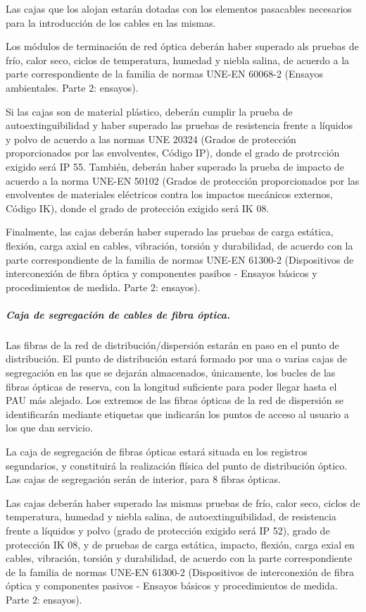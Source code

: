 Las cajas que los alojan estarán dotadas con los elementos pasacables necesarios para la introducción de los cables en las mismas.

Los módulos de terminación de red óptica deberán haber superado als pruebas de frío, calor seco, ciclos de temperatura, humedad y niebla salina, de acuerdo a la parte correspondiente de la familia de normas UNE-EN 60068-2 (Ensayos ambientales. Parte 2: ensayos).

Si las cajas son de material plástico, deberán cumplir la prueba de autoextinguibilidad y haber superado las pruebas de resistencia frente a líquidos y polvo de acuerdo a las normas UNE 20324 (Grados de protección proporcionados por las envolventes, Código IP), donde el grado de protrcción exigido será IP 55. También, deberán haber superado la prueba de impacto de acuerdo a la norma UNE-EN 50102 (Grados de protección proporcionados por las envolventes de materiales eléctricos contra los impactos mecánicos externos, Código IK), donde el grado de protección exigido será IK 08.

Finalmente, las cajas deberán haber superado las pruebas de carga estática, flexión, carga axial en cables, vibración, torsión y durabilidad, de acuerdo con la parte correspondiente de la familia de normas UNE-EN 61300-2 (Dispositivos de interconexión de fibra óptica y componentes pasibos - Ensayos básicos y procedimientos de medida. Parte 2: ensayos).

\subparagraph{Caja de segregación de cables de fibra óptica.}
Las fibras de la red de distribución/dispersión estarán en paso en el punto de distribución. El punto de distribución estará formado por una o varias cajas de segregación en las que se dejarán almacenados, únicamente, los bucles de las fibras ópticas de reserva, con la longitud suficiente para poder llegar hasta el PAU más alejado. Los extremos de las fibras ópticas de la red de dispersión se identificarán mediante etiquetas que indicarán los puntos de acceso al usuario a los que dan servicio.

La caja de segregación de fibras ópticas estará situada en los registros segundarios, y constituirá la realización flísica del punto de distribución óptico. Las cajas de segregación serán de interior, para 8 fibras ópticas.

Las cajas deberán haber superado las mismas pruebas de frío, calor seco, ciclos de temperatura, humedad y niebla salina, de autoextinguibilidad, de resistencia frente a líquidos y polvo (grado de protección exigido será IP 52), grado de protección IK 08, y de pruebas de carga estática, impacto, flexión, carga exial en cables, vibración, torsión y durabilidad, de acuerdo con la parte correspondiente de la familia de normas UNE-EN 61300-2 (Dispositivos de interconexión de fibra óptica y componentes pasivos - Ensayos básicos y procedimientos de medida. Parte 2: ensayos).

